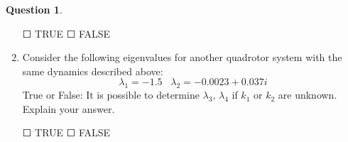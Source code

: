 \documentclass{article}
\theoremstyle{definition}
\newtheorem{question}{Question}
\newcommand{\option}{{\Large$\Square$ }}
\begin{document}
\begin{question}
\begin{enumerate}
    \vspace{1ex}
    \option TRUE \hspace{1cm} \option FALSE
    \vspace{1ex}
    
    \item Consider the following eigenvalues for another quadrotor system with the same dynamics described above:
    \begin{equation*}
        \lambda_1 = -1.5 \hspace{10pt} \lambda_2 = -0.0023+0.037i
    \end{equation*}
    True or False: It is possible to determine $\lambda_3$, $\lambda_4$ if $k_1$ or $k_2$ are unknown. Explain your answer.
        
    \vspace{1ex}
    \option TRUE \hspace{1cm} \option FALSE 
    \end{enumerate}
\end{question}

\vspace{0.1cm}
\end{document}
